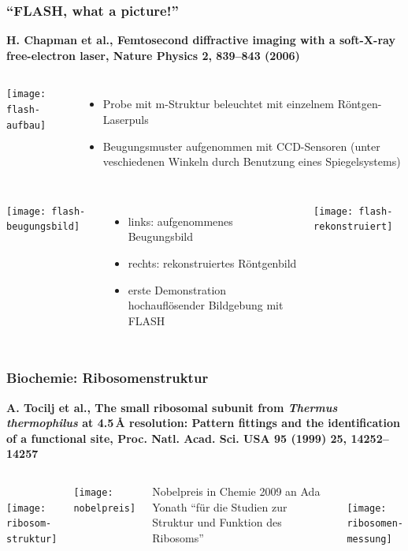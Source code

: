 \documentclass[10pt,t]{beamer}
\begin{document}
\begin{frame}
\frametitle{``FLASH, what a picture!''}
\vspace*{-2.6\baselineskip}
\alert{\bfseries\footnotesize H. Chapman et al., Femtosecond diffractive imaging with a soft-X-ray free-electron laser, Nature Physics 2, 839--843 (2006) \cite{Chapman2006}}
\vspace*{\baselineskip}
\begin{columns}[c]
\texttt{[image: flash-aufbau]}
\begin{itemize}
    \item Probe mit \textmu m-Struktur beleuchtet mit einzelnem Röntgen-Laserpuls
    \item Beugungsmuster aufgenommen mit CCD-Sensoren (unter veschiedenen Winkeln durch Benutzung eines Spiegelsystems)
\end{itemize}
\end{columns}
\vspace*{1ex}
\begin{columns}[c]
\texttt{[image: flash-beugungsbild]}
\begin{itemize}
    \item links: aufgenommenes Beugungsbild
    \item rechts: rekonstruiertes Röntgenbild
    \item erste Demonstration hochauflösender Bildgebung mit FLASH
\end{itemize}
\texttt{[image: flash-rekonstruiert]}
\end{columns}
\vspace*{-3pt}
\end{frame}


\begin{frame}
\frametitle{Biochemie: Ribosomenstruktur}
\vspace*{-2.6\baselineskip}
\alert{\bfseries\footnotesize A. Tocilj et al., The small ribosomal subunit from \textit{Thermus thermophilus} at 4.5\,\AA{} resolution: Pattern fittings and the identification of a functional site, Proc. Natl. Acad. Sci. USA 95 (1999) 25, 14252--14257 \cite{Tocilj1999}}
\vspace*{\baselineskip}
\begin{columns}
~\\[-\baselineskip]
    \texttt{[image: ribosom-struktur]}
    \vspace*{-1ex}

    \begin{minipage}[c]{0.2\textwidth}
        \texttt{[image: nobelpreis]}
    \end{minipage}
    \hfill
    \begin{minipage}[c]{0.75\textwidth}\raggedright\footnotesize
        Nobelpreis in Chemie 2009 an Ada Yonath ``für die Studien zur Struktur und Funktion des Ribosoms''
    \end{minipage}
~\\[-\baselineskip]
    \texttt{[image: ribosomen-messung]}
\end{columns}
\vspace*{-7pt}
\end{frame}
\end{document}
